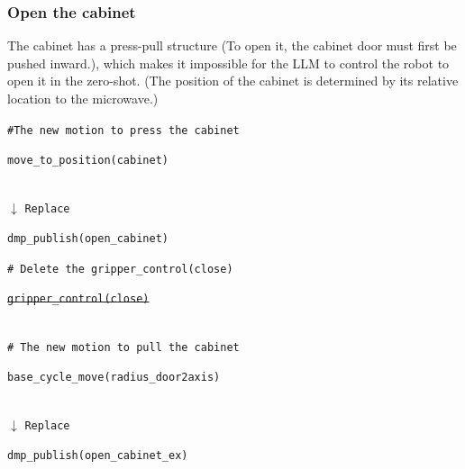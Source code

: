 \documentclass[letterpaper,conference]{ieeeconf}
\begin{document}
\subsubsection{Open the cabinet}
The cabinet has a press-pull structure (To open it, the cabinet door must first be pushed inward.), which makes it impossible for the LLM to control the robot to open it in the zero-shot. (The position of the cabinet is determined by its relative location to the microwave.)
\begin{codebox}
\textcolor{codegreen}{\footnotesize \texttt{\#The new motion to press the cabinet}}\\
\colorbox{codeblue}{%
    \begin{minipage}{\dimexpr\textwidth-6pt\relax}
       \footnotesize  \texttt{move\_to\_position(cabinet)}
    \end{minipage}%
}\\
\hspace*{2cm}$\downarrow$ \texttt{Replace}\\
\colorbox{dmpcolor}{%
    \begin{minipage}{\dimexpr\textwidth-6pt\relax}
        \footnotesize \texttt{dmp\_publish(open\_cabinet)}
    \end{minipage}%
}
\textcolor{codegreen}{\footnotesize \texttt{\# Delete the gripper\_control(close)}}\\
\colorbox{codeblue}{%
    \begin{minipage}{\dimexpr\textwidth-6pt\relax}
        \sout{\footnotesize \texttt{gripper\_control(close)}}
    \end{minipage}%
}\\
\textcolor{codegreen}{\footnotesize \texttt{\# The new motion to pull the cabinet}}\\
\colorbox{codeblue}{%
    \begin{minipage}{\dimexpr\textwidth-6pt\relax}
        \footnotesize \texttt{base\_cycle\_move(radius\_door2axis)}
    \end{minipage}%
}\\
\hspace*{2cm}$\downarrow$ \texttt{Replace}\\
\colorbox{dmpcolor}{%
    \begin{minipage}{\dimexpr\textwidth-6pt\relax}
        \footnotesize \texttt{dmp\_publish(open\_cabinet\_ex)}
    \end{minipage}%
}
\end{codebox}
\vspace{-1.5mm}
\end{document}
